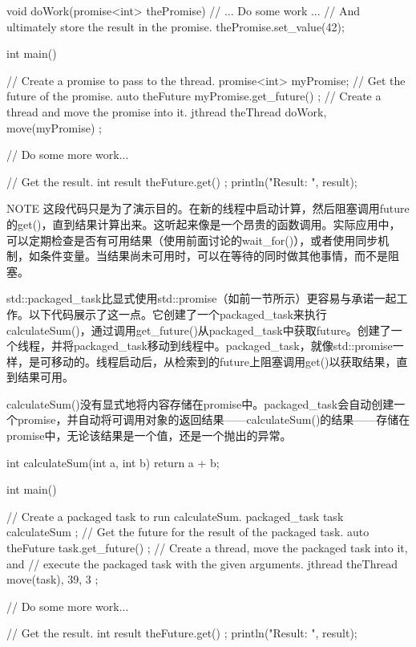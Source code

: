 \begin{cpp}
void doWork(promise<int> thePromise)
{
    // ... Do some work ...
    // And ultimately store the result in the promise.
    thePromise.set_value(42);
}

int main()
{
    // Create a promise to pass to the thread.
    promise<int> myPromise;
    // Get the future of the promise.
    auto theFuture { myPromise.get_future() };
    // Create a thread and move the promise into it.
    jthread theThread { doWork, move(myPromise) };

    // Do some more work...

    // Get the result.
    int result { theFuture.get() };
    println("Result: {}", result);
}
\end{cpp}

\begin{myNotic}{NOTE}
这段代码只是为了演示目的。在新的线程中启动计算，然后阻塞调用future的get()，直到结果计算出来。这听起来像是一个昂贵的函数调用。实际应用中，可以定期检查是否有可用结果（使用前面讨论的wait\_for()），或者使用同步机制，如条件变量。当结果尚未可用时，可以在等待的同时做其他事情，而不是阻塞。
\end{myNotic}


std::packaged\_task比显式使用std::promise（如前一节所示）更容易与承诺一起工作。以下代码展示了这一点。它创建了一个packaged\_task来执行calculateSum()，通过调用get\_future()从packaged\_task中获取future。创建了一个线程，并将packaged\_task移动到线程中。packaged\_task，就像std::promise一样，是可移动的。线程启动后，从检索到的future上阻塞调用get()以获取结果，直到结果可用。

calculateSum()没有显式地将内容存储在promise中。packaged\_task会自动创建一个promise，并自动将可调用对象的返回结果——calculateSum()的结果——存储在promise中，无论该结果是一个值，还是一个抛出的异常。

\begin{cpp}
int calculateSum(int a, int b) { return a + b; }

int main()
{
    // Create a packaged task to run calculateSum.
    packaged_task task { calculateSum };
    // Get the future for the result of the packaged task.
    auto theFuture { task.get_future() };
    // Create a thread, move the packaged task into it, and
    // execute the packaged task with the given arguments.
    jthread theThread { move(task), 39, 3 };

    // Do some more work...

    // Get the result.
    int result { theFuture.get() };
    println("Result: {}", result);
}
\end{cpp}

